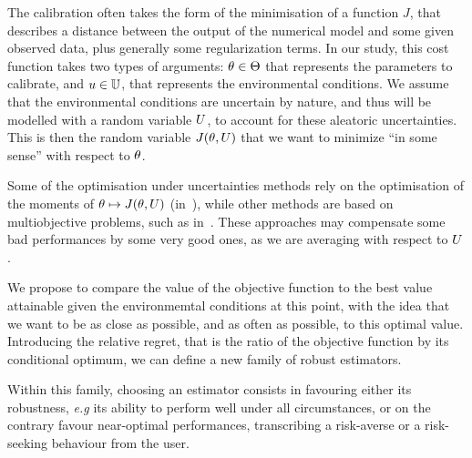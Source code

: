 \documentclass[../../Main_ManuscritThese.tex]{subfiles}
\begin{document}
  The calibration often takes the form of the minimisation of a
function $J$, that describes a distance between the output of the
numerical model and some given observed data, plus generally some
regularization terms.  In our study, this cost function takes two
types of arguments: $\theta\in\Theta$ that represents the parameters to
calibrate, and $u\in\mathbb{U}$, that represents the environmental
conditions.  We assume that the environmental conditions are uncertain
by nature, and thus will be modelled with a random variable $U$, to
account for these aleatoric uncertainties.  This is then the random
variable $J(\theta,U)$ that we want to minimize ``in some sense'' with
respect to $\theta$.

  Some of the optimisation under uncertainties methods rely on the
optimisation of the moments of $ \theta\mapsto J(\theta,U)$
(in~\cite{lehman_designing_2004,janusevskis_simultaneous_2010}), while
other methods are based on multiobjective problems, such as
in~\cite{baudoui_optimisation_2012,ribaud_krigeage_2018}.  These
approaches may compensate some bad performances by some very good
ones, as we are averaging with respect to  $U$.

  
  We propose to compare the value of the objective function to the
best value attainable given the environmemtal conditions at this
point, with the idea that we want to be as close as possible, and as
often as possible, to this optimal value. Introducing the relative
regret, that is the ratio of the objective function by its conditional
optimum, we can define a new family of robust estimators.

  Within this family, choosing an estimator consists in favouring
either its robustness, \emph{e.g} its ability to perform well under
all circumstances, or on the contrary favour near-optimal
performances, transcribing a risk-averse or a risk-seeking behaviour
from the user.
 


\subfileLocal{
	\pagestyle{empty}
	
	
}
\end{document}
